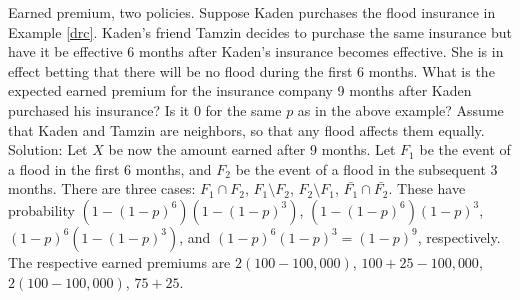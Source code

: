 \begin{example}{Earned premium, two policies.}
	Suppose Kaden purchases the flood insurance in Example \ref{drc}. Kaden's friend Tamzin decides to purchase the same insurance
	but have it be effective 6 months after Kaden's insurance becomes effective. She is in effect betting that there will be no
	flood during the first 6 months.
	What is the expected earned premium for the insurance company 9 months after Kaden purchased his insurance?
	Is it 0 for the same $p$ as in the above example?
	Assume that Kaden and Tamzin are neighbors, so that any flood affects them equally.
	Solution:
		Let $X$ be now the amount earned after 9 months.
		Let $F_1$ be the event of a flood in the first 6 months, and $F_2$ be the event of a flood in the subsequent 3 months.
		There are three cases:
		$F_1\cap F_2$,
		$F_1\setminus F_2$,
		$F_2\setminus F_1$,
		$\bar{F_1}\cap\bar{F_2}$.
		These have probability
		$(1-(1-p)^6)(1-(1-p)^3)$,
		$(1-(1-p)^6)(1-p)^3$,
		$(1-p)^6(1-(1-p)^3)$, and
		$(1-p)^6(1-p)^3=(1-p)^9$, respectively.
		The respective earned premiums are
		$2(100-100,000)$,
		$100+25-100,000$,
		$2(100-100,000)$,
		$75+25$.
		

\end{example}
